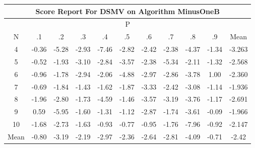 \documentclass[11pt,a4paper]{report}
\begin{document}
\begin{longtable}{ | c || c | c | c | c | c | c | c | c | c || c |}
\hline
\multicolumn{11}{|c|}{ Score Report For DSMV on Algorithm MinusOneB} \\
\hline
\multicolumn{11}{|c|}{ P } \\
\hline
N & .1 & .2 & .3 & .4 & .5 & .6 & .7 & .8 & .9 & Mean\\
 \hline
 \hline
 \endhead
  4 &  \cellcolor[HTML]{FFF7F7} -0.36 &  \cellcolor[HTML]{FF7878} -5.28 &  \cellcolor[HTML]{FFB7B7} -2.93 &  \cellcolor[HTML]{FF4848} -7.46 &  \cellcolor[HTML]{FFB7B7} -2.82 &  \cellcolor[HTML]{FFBFBF} -2.42 &  \cellcolor[HTML]{FFBFBF} -2.38 &  \cellcolor[HTML]{FF8F8F} -4.37 &  \cellcolor[HTML]{FFDFDF} -1.34 & -3.263 \\
  5 &  \cellcolor[HTML]{FFEFEF} -0.52 &  \cellcolor[HTML]{FFCFCF} -1.93 &  \cellcolor[HTML]{FFAFAF} -3.10 &  \cellcolor[HTML]{FFB7B7} -2.84 &  \cellcolor[HTML]{FFA7A7} -3.57 &  \cellcolor[HTML]{FFC7C7} -2.38 &  \cellcolor[HTML]{FF7878} -5.34 &  \cellcolor[HTML]{FFC7C7} -2.11 &  \cellcolor[HTML]{FFDFDF} -1.32 & -2.568 \\
  6 &  \cellcolor[HTML]{FFE7E7} -0.96 &  \cellcolor[HTML]{FFCFCF} -1.78 &  \cellcolor[HTML]{FFB7B7} -2.94 &  \cellcolor[HTML]{FFC7C7} -2.06 &  \cellcolor[HTML]{FF8787} -4.88 &  \cellcolor[HTML]{FFB7B7} -2.97 &  \cellcolor[HTML]{FFB7B7} -2.86 &  \cellcolor[HTML]{FF9F9F} -3.78 &  \cellcolor[HTML]{E7E7FF} 1.00 & -2.360 \\
  7 &  \cellcolor[HTML]{FFEFEF} -0.69 &  \cellcolor[HTML]{FFCFCF} -1.84 &  \cellcolor[HTML]{FFD7D7} -1.43 &  \cellcolor[HTML]{FFD7D7} -1.62 &  \cellcolor[HTML]{FFCFCF} -1.87 &  \cellcolor[HTML]{FFAFAF} -3.33 &  \cellcolor[HTML]{FFBFBF} -2.42 &  \cellcolor[HTML]{FFAFAF} -3.08 &  \cellcolor[HTML]{FFDFDF} -1.14 & -1.936 \\
  8 &  \cellcolor[HTML]{FFCFCF} -1.96 &  \cellcolor[HTML]{FFB7B7} -2.80 &  \cellcolor[HTML]{FFD7D7} -1.73 &  \cellcolor[HTML]{FF8F8F} -4.59 &  \cellcolor[HTML]{FFD7D7} -1.46 &  \cellcolor[HTML]{FFA7A7} -3.57 &  \cellcolor[HTML]{FFAFAF} -3.19 &  \cellcolor[HTML]{FF9F9F} -3.76 &  \cellcolor[HTML]{FFDFDF} -1.17 & -2.691 \\
  9 &  \cellcolor[HTML]{EFEFFF} 0.59 &  \cellcolor[HTML]{FF6868} -5.95 &  \cellcolor[HTML]{FFD7D7} -1.60 &  \cellcolor[HTML]{FFDFDF} -1.31 &  \cellcolor[HTML]{FFDFDF} -1.12 &  \cellcolor[HTML]{FFB7B7} -2.87 &  \cellcolor[HTML]{FFD7D7} -1.74 &  \cellcolor[HTML]{FFA7A7} -3.61 &  \cellcolor[HTML]{FFFFFF} -0.09 & -1.966 \\
  10 &  \cellcolor[HTML]{FFD7D7} -1.68 &  \cellcolor[HTML]{FFB7B7} -2.73 &  \cellcolor[HTML]{FFD7D7} -1.63 &  \cellcolor[HTML]{FFE7E7} -0.93 &  \cellcolor[HTML]{FFEFEF} -0.77 &  \cellcolor[HTML]{FFE7E7} -0.95 &  \cellcolor[HTML]{FFCFCF} -1.76 &  \cellcolor[HTML]{FF3838} -7.96 &  \cellcolor[HTML]{FFE7E7} -0.92 & -2.147 \\
 \hline
 \hline
Mean &  \cellcolor[HTML]{FFE7E7} -0.80 &  \cellcolor[HTML]{FFAFAF} -3.19 &  \cellcolor[HTML]{FFC7C7} -2.19 &  \cellcolor[HTML]{FFB7B7} -2.97 &  \cellcolor[HTML]{FFC7C7} -2.36 &  \cellcolor[HTML]{FFBFBF} -2.64 &  \cellcolor[HTML]{FFB7B7} -2.81 &  \cellcolor[HTML]{FF9797} -4.09 &  \cellcolor[HTML]{FFEFEF} -0.71 &  \cellcolor[HTML]{FFBFBF} -2.42
\end{longtable}
\end{document}
